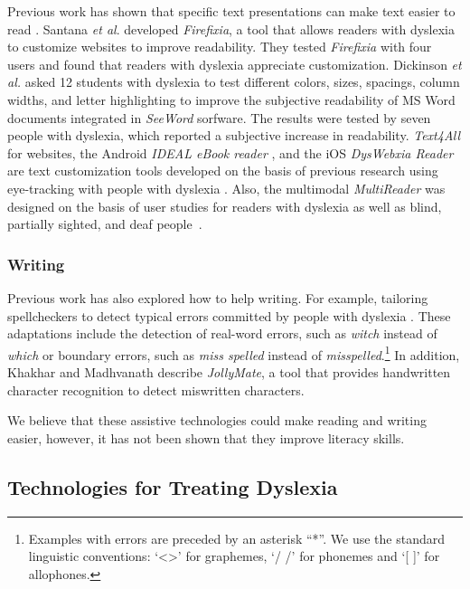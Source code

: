 \documentclass[letterpaper]{sig-alternate-2013}
\begin{document}
Previous work has shown that specific text presentations can make text easier to read \cite{Gregor2000,Kurniawan2006}.
Santana {\it et al}. \cite{W4A2013Santana} developed {\it Firefixia}, a tool that allows readers with dyslexia to customize websites to improve readability.
They tested {\it Firefixia} with four users and found that readers with dyslexia appreciate customization.
Dickinson {\it et al.} \cite{Dickinson2002} asked 12 students with dyslexia to test different colors, sizes, spacings, column widths, and letter highlighting to improve the subjective readability of MS Word documents integrated in {\it SeeWord} sorfware. The results were tested by seven people with dyslexia, which reported a subjective increase in readability.
{\it Text4All} \cite{Topac2012} for websites, the Android {\it IDEAL eBook reader} \cite{ASSETS2012}, and the iOS {\it DysWebxia Reader} \cite{ASSETS2013demo} are text customization tools developed on the basis of previous research using eye-tracking with people with dyslexia \cite{W4A2012}. Also, the multimodal {\it MultiReader} was designed on the basis of user studies for readers with dyslexia as well as blind, partially sighted, and deaf people~\cite{Petrie2001multireader}. 




\subsubsection{Writing}

Previous work has also explored how to help writing.
For example, tailoring spellcheckers to detect typical errors committed by people with dyslexia \cite{Korhonen2008,Li2013,Pedler2007}. These adaptations include the detection of real-word errors, such as {\it *witch} instead of {\it which} or boundary errors, such as {\it *miss spelled} instead of {\it misspelled}.\footnote{Examples with errors are preceded by an asterisk ``*''. We use the standard linguistic conventions: `\textless \textgreater' for graphemes,  `/ /' for phonemes and `[ ]' for allophones.} 
In addition, Khakhar and Madhvanath \cite{Khakhar2010} describe {\it JollyMate}, a tool that provides handwritten character recognition to detect miswritten characters.

We believe that these assistive technologies could make reading and writing easier, however, it has not been shown that they improve literacy skills.


\subsection{Technologies for Treating Dyslexia}
\end{document}
